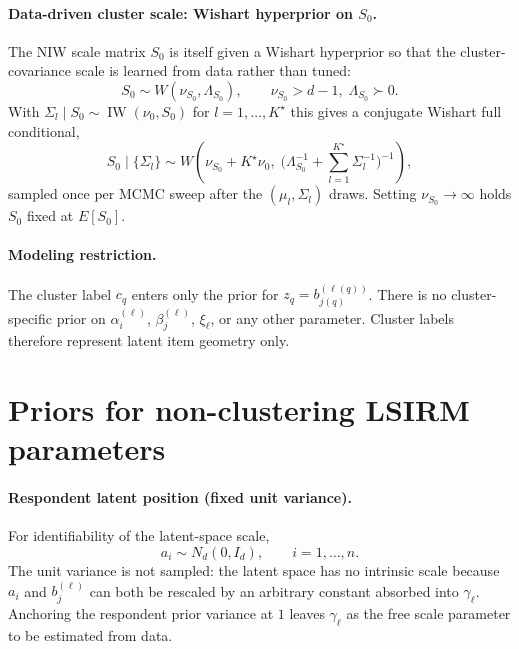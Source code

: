 \documentclass[11pt]{article}
\DeclareMathOperator{\IW}{IW}
\begin{document}
\paragraph{Data-driven cluster scale: Wishart hyperprior on $S_0$.}
The NIW scale matrix $S_0$ is itself given a Wishart hyperprior so that the
cluster-covariance scale is learned from data rather than tuned:
\begin{equation}
    S_0\sim W(\nu_{S_0},\Lambda_{S_0}),
    \qquad \nu_{S_0}>d-1,\;\Lambda_{S_0}\succ 0.
    \label{eq:S0-hyperprior}
\end{equation}
With $\Sigma_l\mid S_0\sim\IW(\nu_0,S_0)$ for $l=1,\dots,K^\star$ this gives
a conjugate Wishart full conditional,
\begin{equation}
    S_0\mid\{\Sigma_l\}
    \sim
    W\!\left(
    \nu_{S_0}+K^\star\nu_0,\;
    \bigl(\Lambda_{S_0}^{-1}+\sum_{l=1}^{K^\star}\Sigma_l^{-1}\bigr)^{-1}
    \right),
    \label{eq:S0-update}
\end{equation}
sampled once per MCMC sweep after the $(\mu_l,\Sigma_l)$ draws.  Setting
$\nu_{S_0}\to\infty$ holds $S_0$ fixed at $E[S_0]$.

\paragraph{Modeling restriction.}
The cluster label $c_q$ enters only the prior for $z_q=b_{j(q)}^{(\ell(q))}$.
There is no cluster-specific prior on $\alpha_i^{(\ell)}$,
$\beta_j^{(\ell)}$, $\xi_\ell$, or any other parameter.  Cluster labels
therefore represent latent item geometry only.

\section{Priors for non-clustering LSIRM parameters}

\paragraph{Respondent latent position (fixed unit variance).}
For identifiability of the latent-space scale,
\begin{equation}
    a_i\sim N_d(0,I_d),\qquad i=1,\dots,n.
    \label{eq:a-prior}
\end{equation}
The unit variance is not sampled: the latent space has no intrinsic scale
because $a_i$ and $b_j^{(\ell)}$ can both be rescaled by an arbitrary
constant absorbed into $\gamma_\ell$.  Anchoring the respondent prior
variance at $1$ leaves $\gamma_\ell$ as the free scale parameter to be
estimated from data.
\end{document}
